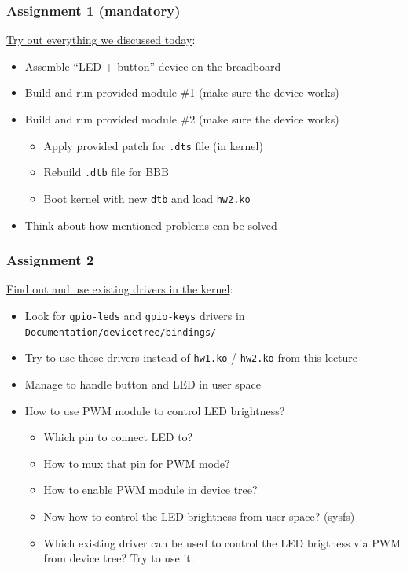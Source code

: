 \begin{frame}
  \frametitle{Assignment 1 (mandatory)}
  \underline{Try out everything we discussed today}:
  \begin{itemize}
    \item Assemble ``LED + button'' device on the breadboard
    \item Build and run provided module \#1 (make sure the device works)
    \item Build and run provided module \#2 (make sure the device works)
    \begin{itemize}
      \item Apply provided patch for \texttt{.dts} file (in kernel)
      \item Rebuild \texttt{.dtb} file for BBB
      \item Boot kernel with new \texttt{dtb} and load \texttt{hw2.ko}
    \end{itemize}
    \item Think about how mentioned problems can be solved
  \end{itemize}
\end{frame}

\begin{frame}
  \frametitle{Assignment 2}
  \underline{Find out and use existing drivers in the kernel}:
  \begin{itemize}
    \item Look for \texttt{gpio-leds} and \texttt{gpio-keys} drivers in
          \texttt{Documentation/devicetree/bindings/}
    \item Try to use those drivers instead of \texttt{hw1.ko} / \texttt{hw2.ko}
          from this lecture
    \item Manage to handle button and LED in user space
    \item How to use PWM module to control LED brightness?
    \begin{itemize}
      \item Which pin to connect LED to?
      \item How to mux that pin for PWM mode?
      \item How to enable PWM module in device tree?
      \item Now how to control the LED brightness from user space? (sysfs)
      \item Which existing driver can be used to control the LED brigtness via
            PWM from device tree? Try to use it.
    \end{itemize}
  \end{itemize}
\end{frame}

